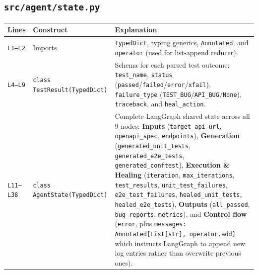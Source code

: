 \documentclass[11pt,a4paper]{article}
\begin{document}
\subsection{\texttt{src/agent/state.py}}
\begin{longtable}{L{1.4cm} L{5.2cm} L{9.0cm}}
\toprule
\textbf{Lines} & \textbf{Construct} & \textbf{Explanation} \\
\midrule
\endhead
\texttt{L1--L2} & Imports & \texttt{TypedDict}, typing generics, \texttt{Annotated}, and \texttt{operator} (used for list-append reducer). \\
\texttt{L4--L9} & \texttt{class TestResult(TypedDict)} & Schema for each parsed test outcome: \texttt{test\_name}, \texttt{status} (\texttt{passed}/\texttt{failed}/\texttt{error}/\texttt{xfail}), \texttt{failure\_type} (\texttt{TEST\_BUG}/\texttt{API\_BUG}/\texttt{None}), \texttt{traceback}, and \texttt{heal\_action}. \\
\texttt{L11--L38} & \texttt{class AgentState(TypedDict)} & Complete LangGraph shared state across all 9 nodes: \textbf{Inputs} (\texttt{target\_api\_url}, \texttt{openapi\_spec}, \texttt{endpoints}), \textbf{Generation} (\texttt{generated\_unit\_tests}, \texttt{generated\_e2e\_tests}, \texttt{generated\_conftest}), \textbf{Execution \& Healing} (\texttt{iteration}, \texttt{max\_iterations}, \texttt{test\_results}, \texttt{unit\_test\_failures}, \texttt{e2e\_test\_failures}, \texttt{healed\_unit\_tests}, \texttt{healed\_e2e\_tests}), \textbf{Outputs} (\texttt{all\_passed}, \texttt{bug\_reports}, \texttt{metrics}), and \textbf{Control flow} (\texttt{error}, plus \texttt{messages: Annotated[List[str], operator.add]} which instructs LangGraph to append new log entries rather than overwrite previous ones). \\
\bottomrule
\end{longtable}

\end{document}
